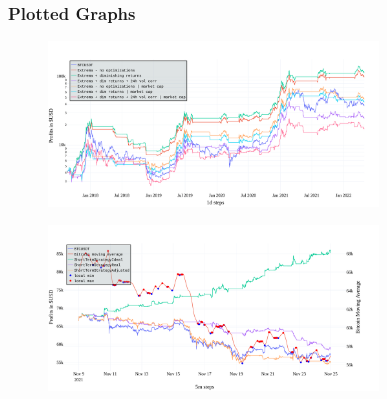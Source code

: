 \begin{frame}
  \frametitle{Plotted Graphs}
  \centering

  \vspace{-0.77em}

  \begin{figure}
    \includegraphics[width=0.78\textwidth]{img/evaluation-optimization-shorter.pdf}
  \end{figure}

  \vspace{-1.1em}

  \begin{figure}
    \includegraphics[width=0.78\textwidth]{img/short-term-falling.pdf}
  \end{figure}

\end{frame}

